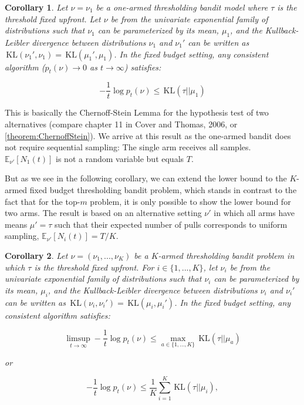 \documentclass[11pt,]{article}
\newtheorem{corollary}{Corollary}
\newcommand{\KL}{\,\text{KL}}
\begin{document}
\begin{corollary}
Let $\nu = \nu_1$ be a one-armed thresholding bandit model where $\tau$ is the threshold fixed upfront. Let $\nu$ be from the univariate exponential family of distributions such that $\nu_1$ can be parameterized by its mean, $\mu_1$, and the Kullback-Leibler divergence between distributions $\nu_1$ and $\nu_1'$ can be written as $\KL(\nu_1', \nu_1) = \KL(\mu_1', \mu_1)$. In the fixed budget setting, any consistent algorithm ($p_t(\nu) \rightarrow 0$ as $t \rightarrow \infty$) satisfies:

$$
- \frac{1}{t} \log p_t(\nu) \leq \KL(\tau || \mu_1)
$$
\end{corollary}

\label{corollary:LB1TBP}

This is basically the Chernoff-Stein Lemma for the hypothesis test of
two alternatives (compare chapter 11 in Cover and Thomas, 2006, or
\autoref{theorem:ChernoffStein}). We arrive at this result as the
one-armed bandit does not require sequential sampling: The single arm
receives all samples. \(\mathbb{E}_{\nu'}[N_1(t)]\) is not a random
variable but equals \(T\).

But as we see in the following corollary, we can extend the lower bound
to the \(K\)-armed fixed budget thresholding bandit problem, which
stands in contrast to the fact that for the top-\(m\) problem, it is
only possible to show the lower bound for two arms. The result is based
on an alternative setting \(\nu'\) in which all arms have means
\(\mu' = \tau\) such that their expected number of pulls corresponds to
uniform sampling, \(\mathbb{E}_{\nu'}[N_i(t)] = T/K\).

\begin{corollary}
Let $\nu = (\nu_1, ..., \nu_K)$ be a $K$-armed thresholding bandit problem in which $\tau$ is the threshold fixed upfront. For $i \in \{1,...,K\}$, let $\nu_i$ be from the univariate exponential family of distributions such that $\nu_i$ can be parameterized by its mean, $\mu_i$, and the Kullback-Leibler divergence between distributions $\nu_i$ and $\nu_i'$ can be written as $\KL(\nu_i, \nu_i') = \KL(\mu_i, \mu_i')$. In the fixed budget setting, any consistent algorithm satisfies:

$$
\limsup_{t \rightarrow \infty} -\frac{1}{t} \log p_t(\nu) \leq \max_{a \in \{1,...,K\}} \KL(\tau || \mu_a)
$$

or

$$
- \frac{1}{t} \log p_t(\nu) \leq \frac{1}{K}\sum_{i=1}^{K} \KL(\tau || \mu_i),
$$
\end{corollary}
\end{document}
